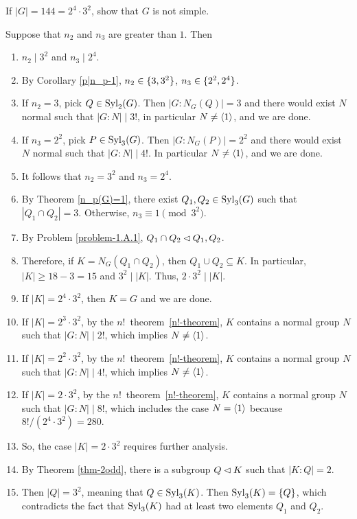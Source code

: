 \begin{probl}
    If\/ $|G|=144=2^4\cdot3^2$, show that\/ $G$ is not simple.
\end{probl}

\begin{solution} Suppose that $n_2$ and $n_3$ are greater than $1$. Then
\begin{enumerate}[\upshape1.]
    \item $n_2\mid3^2$ and $n_3\mid2^4$.
    \item By Corollary \ref{p|n_p-1}, $n_2\in\{3,3^2\}$, $n_3\in\{2^2, 2^4\}$.
    \item If $n_2=3$, pick $Q\in{\rm Syl}_2(G)$. Then $|G:N_G(Q)|=3$ and there would exist $N$ normal such that $|G:N|\mid3!$, in particular $N\ne\langle1\rangle$, and we are done.
    \item If $n_3=2^2$, pick $P\in{\rm Syl}_3(G)$. Then $|G:N_G(P)|=2^2$ and there would exist $N$ normal such that $|G:N|\mid 4!$. In particular $N\ne\langle1\rangle$, and we are done.
    \item It follows that $n_2=3^2$ and $n_3=2^4$.
    \item By Theorem \ref{n_p(G)=1}, there exist $Q_1,Q_2\in{\rm Syl}_3(G)$ such that $|Q_1\cap Q_2|=3$. Otherwise, $n_3\equiv1\pmod{3^2}$.
    \item By Problem \ref{problem-1.A.1}, $Q_1\cap Q_2\lhd Q_1, Q_2$.
    \item Therefore, if $K=N_G(Q_1\cap Q_2)$, then $Q_1\cup Q_2\subseteq K$. In particular, $|K|\ge 18-3=15$ and $3^2\mid|K|$. Thus, $2\cdot3^2\mid|K|$.
    \item If $|K|=2^4\cdot3^2$, then $K=G$ and we are done.
    \item If $|K|=2^3\cdot3^2$, by the $n!$~theorem~\ref{n!-theorem}, $K$ contains a normal group $N$ such that $|G:N|\mid2!$, which implies $N\ne\langle1\rangle$.
    \item If $|K|=2^2\cdot3^2$, by the $n!$~theorem~\ref{n!-theorem}, $K$ contains a normal group $N$ such that $|G:N|\mid4!$, which implies $N\ne\langle1\rangle$.
    \item If $|K|=2\cdot3^2$, by the $n!$~theorem~\ref{n!-theorem}, $K$ contains a normal group $N$ such that $|G:N|\mid8!$, which includes the case $N=\langle1\rangle$ because $8!/(2^4\cdot3^2)=280$.
    \item So, the case $|K|=2\cdot3^2$ requires further analysis.
    \item By Theorem \ref{thm-2odd}, there is a subgroup $Q\lhd K$ such that $|K:Q|=2$.
    \item Then $|Q|=3^2$, meaning that $Q\in{\rm Syl}_3(K)$. Then ${\rm Syl}_3(K)=\{Q\}$, which contradicts the fact that ${\rm Syl}_3(K)$ had at least two elements $Q_1$ and $Q_2$.
\end{enumerate}
\end{solution}

